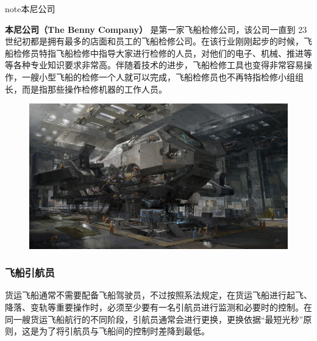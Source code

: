 \documentclass[letterpaper,10pt]{sphinxmanual}
\begin{document}
\begin{notice}{note}{本尼公司}

\textbf{本尼公司（The Benny Company）} 是第一家飞船检修公司，该公司一直到 23 世纪初都是拥有最多的店面和员工的飞船检修公司。在该行业刚刚起步的时候，飞船检修员特指飞船检修中指导大家进行检修的人员，对他们的电子、机械、推进等等各种专业知识要求非常高。伴随着技术的进步，飞船检修工具也变得非常容易操作，一艘小型飞船的检修一个人就可以完成，飞船检修员也不再特指检修小组组长，而是指那些操作检修机器的工作人员。
\end{notice}
\begin{figure}[htbp]
\centering

\includegraphics{330250.jpg}
\end{figure}


\subsubsection{飞船引航员}
\label{profession:id5}
货运飞船通常不需要配备飞船驾驶员，不过按照系法规定，在货运飞船进行起飞、降落、变轨等重要操作时，必须至少要有一名引航员进行监测和必要时的控制。在同一艘货运飞船航行的不同阶段，引航员通常会进行更换，更换依据“最短光秒”原则，这是为了将引航员与飞船间的控制时差降到最低。
\end{document}
